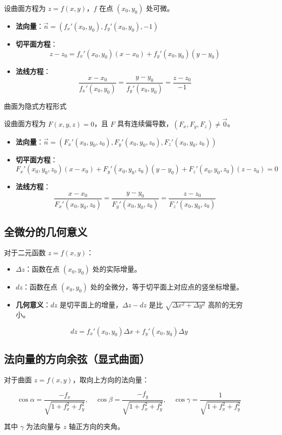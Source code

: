 \documentclass[12pt]{book}
\newcommand{\hei}{\CJKfamily{hei}}      %
\theoremstyle{mythm}
\begin{document}
设曲面方程为 $z = f(x, y)$，$f$ 在点 $(x_0, y_0)$ 处可微。

\begin{itemize}
    \item \textbf{法向量}：$\vec{n} = (f_x'(x_0, y_0), f_y'(x_0, y_0), -1)$
    \item \textbf{切平面方程}：
    \[
    z - z_0 = f_x'(x_0, y_0)(x - x_0) + f_y'(x_0, y_0)(y - y_0)
    \]
    \item \textbf{法线方程}：
    \[
    \frac{x - x_0}{f_x'(x_0, y_0)} = \frac{y - y_0}{f_y'(x_0, y_0)} = \frac{z - z_0}{-1}
    \]
\end{itemize}

{\hei 曲面为隐式方程形式}

设曲面方程为 $F(x, y, z) = 0$，且 $F$ 具有连续偏导数，$(F_x, F_y, F_z) \neq \vec{0}$。

\begin{itemize}
    \item \textbf{法向量}：$\vec{n} = (F_x'(x_0, y_0, z_0), F_y'(x_0, y_0, z_0), F_z'(x_0, y_0, z_0))$
    \item \textbf{切平面方程}：
    \[
    F_x'(x_0, y_0, z_0)(x - x_0) + F_y'(x_0, y_0, z_0)(y - y_0) + F_z'(x_0, y_0, z_0)(z - z_0) = 0
    \]
    \item \textbf{法线方程}：
    \[
    \frac{x - x_0}{F_x'(x_0, y_0, z_0)} = \frac{y - y_0}{F_y'(x_0, y_0, z_0)} = \frac{z - z_0}{F_z'(x_0, y_0, z_0)}
    \]
\end{itemize}

\subsection{全微分的几何意义}

对于二元函数 $z = f(x, y)$：

\begin{itemize}
    \item $\Delta z$：函数在点 $(x_0, y_0)$ 处的实际增量。
    \item $dz$：函数在点 $(x_0, y_0)$ 处的全微分，等于切平面上对应点的竖坐标增量。
    \item \textbf{几何意义}：$dz$ 是切平面上的增量，$\Delta z - dz$ 是比 $\sqrt{\Delta x^2 + \Delta y^2}$ 高阶的无穷小。
\end{itemize}

\[
dz = f_x'(x_0, y_0)\Delta x + f_y'(x_0, y_0)\Delta y
\]

\subsection{法向量的方向余弦（显式曲面）}

对于曲面 $z = f(x, y)$，取向上方向的法向量：

\[
\cos \alpha = \frac{-f_x}{\sqrt{1 + f_x^2 + f_y^2}}, \quad
\cos \beta = \frac{-f_y}{\sqrt{1 + f_x^2 + f_y^2}}, \quad
\cos \gamma = \frac{1}{\sqrt{1 + f_x^2 + f_y^2}}
\]

其中 $\gamma$ 为法向量与 $z$ 轴正方向的夹角。
\end{document}
